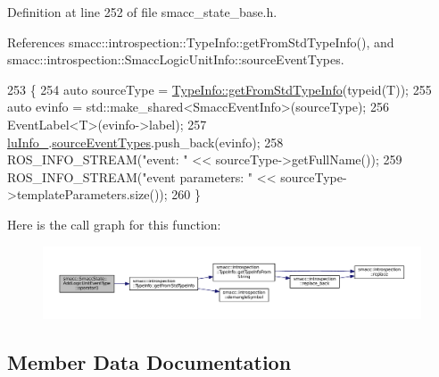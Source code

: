 Definition at line 252 of file smacc\+\_\+state\+\_\+base.\+h.



References smacc\+::introspection\+::\+Type\+Info\+::get\+From\+Std\+Type\+Info(), and smacc\+::introspection\+::\+Smacc\+Logic\+Unit\+Info\+::source\+Event\+Types.


\begin{DoxyCode}
253     \{
254       \textcolor{keyword}{auto} sourceType = \hyperlink{classsmacc_1_1introspection_1_1TypeInfo_ada1e604cd8bf968a5f816fbace4af881}{TypeInfo::getFromStdTypeInfo}(\textcolor{keyword}{typeid}(T));
255       \textcolor{keyword}{auto} evinfo = std::make\_shared<SmaccEventInfo>(sourceType);
256       EventLabel<T>(evinfo->label);
257       \hyperlink{structsmacc_1_1SmaccState_1_1AddLogicUnitEventType_a31c27ea945cd0127080c0bae872c028e}{luInfo\_}.\hyperlink{structsmacc_1_1introspection_1_1SmaccLogicUnitInfo_add386e83d888a7819c0132a75942fa5d}{sourceEventTypes}.push\_back(evinfo);
258       ROS\_INFO\_STREAM(\textcolor{stringliteral}{"event: "} << sourceType->getFullName());
259       ROS\_INFO\_STREAM(\textcolor{stringliteral}{"event parameters: "} << sourceType->templateParameters.size());
260     \}
\end{DoxyCode}


Here is the call graph for this function\+:
\nopagebreak
\begin{figure}[H]
\begin{center}
\leavevmode
\includegraphics[width=350pt]{structsmacc_1_1SmaccState_1_1AddLogicUnitEventType_a8ed7e96e4922fbc8097a6ff078d70150_cgraph}
\end{center}
\end{figure}




\subsection{Member Data Documentation}
